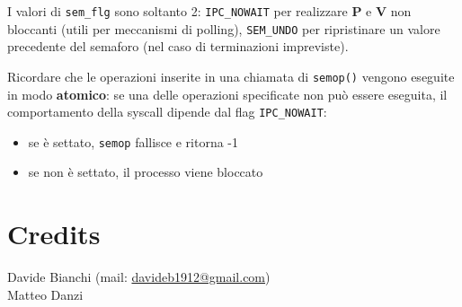 \documentclass[a4paper, 10pt]{article}
\begin{document}
I valori di \verb|sem_flg| sono soltanto 2: \verb|IPC_NOWAIT| per realizzare \textbf{P} e \textbf{V} non bloccanti (utili per meccanismi di polling), \verb|SEM_UNDO| per ripristinare un valore precedente del semaforo (nel caso di terminazioni impreviste).\newpage

Ricordare che le operazioni inserite in una chiamata di \verb|semop()| vengono eseguite in modo \textbf{atomico}: se una delle operazioni specificate non può essere eseguita, il comportamento della syscall dipende dal flag \verb|IPC_NOWAIT|:
\begin{itemize}
\item se è settato, \verb|semop| fallisce e ritorna -1
\item se non è settato, il processo viene bloccato
\end{itemize}
\newpage

\section{Credits}
Davide Bianchi (mail: \url{davideb1912@gmail.com}) \\
Matteo Danzi
\end{document}
